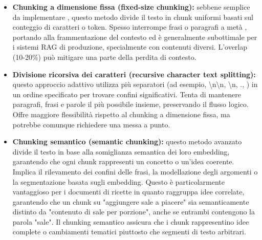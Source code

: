 \documentclass[a4paper, 11pt]{article}
\begin{document}
\begin{itemize}
    \item \textbf{Chunking a dimensione fissa (fixed-size chunking):} sebbene semplice da implementare \cite{f22_chunking_strategies}, questo metodo divide il testo in chunk uniformi basati sul conteggio di caratteri o token. \cite{chunking_strategies_ibm} Spesso interrompe frasi o paragrafi a metà \cite{semantic_chunking_ani}, portando alla frammentazione del contesto ed è generalmente subottimale per i sistemi RAG di produzione, specialmente con contenuti diversi. \cite{databricks_unstructured_data} L'overlap (10-20\%) può mitigare una parte della perdita di contesto. \cite{semantic_chunking_multimodal}
    \item \textbf{Divisione ricorsiva dei caratteri (recursive character text splitting):} questo approccio adattivo utilizza più separatori (ad esempio, \textbackslash n\textbackslash n, \textbackslash n, ., ) in un ordine specificato per trovare confini significativi. \cite{chunking_strategies_ibm} Tenta di mantenere paragrafi, frasi e parole il più possibile insieme, preservando il flusso logico. \cite{chunking_strategies_ibm} Offre maggiore flessibilità rispetto al chunking a dimensione fissa, ma potrebbe comunque richiedere una messa a punto. \cite{semantic_chunking_ani}
    \item \textbf{Chunking semantico (semantic chunking):} questo metodo avanzato divide il testo in base alla somiglianza semantica dei loro embedding, garantendo che ogni chunk rappresenti un concetto o un'idea coerente. \cite{semantic_chunking_multimodal} Implica il rilevamento dei confini delle frasi, la modellazione degli argomenti o la segmentazione basata sugli embedding. \cite{semantic_chunking_ani} Questo è particolarmente vantaggioso per i documenti di ricette in quanto raggruppa idee correlate, garantendo che un chunk su "aggiungere sale a piacere" sia semanticamente distinto da "contenuto di sale per porzione", anche se entrambi contengono la parola "sale". \cite{semantic_chunking_multimodal} Il chunking semantico assicura che i chunk rappresentino idee complete o cambiamenti tematici piuttosto che segmenti di testo arbitrari.

\end{itemize}
\end{document}
